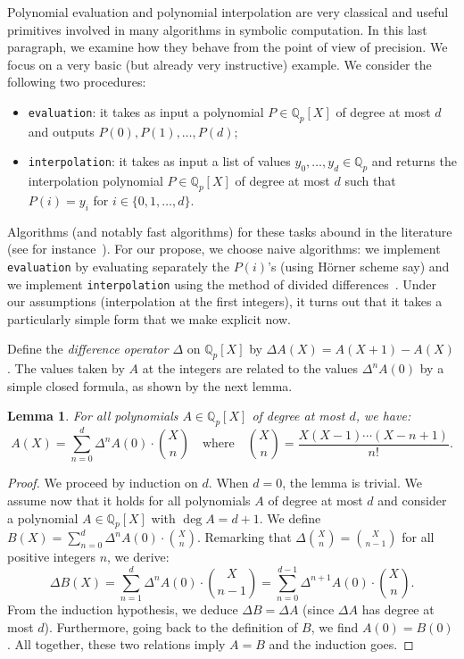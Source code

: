 \documentclass[11pt]{article}
\numberwithin{equation}{section}
\numberwithin{figure}{section}
\newtheorem{lem}[theo]{Lemma}
\theoremstyle{definition}
\newcommand{\Q}{\mathbb Q}
\newcommand{\Qp}{\Q_p}
\begin{document}
Polynomial evaluation and polynomial interpolation are very classical 
and useful primitives involved in many algorithms in symbolic 
computation. In this last paragraph, we examine how they behave from
the point of view of precision. We focus on a very basic (but already
very instructive) example.
We consider the following two procedures:
\begin{itemize}
\renewcommand{\itemsep}{0pt}
\item \texttt{evaluation}: it takes as input a polynomial $P \in \Qp[X]$ 
of degree at most $d$ and outputs $P(0), P(1), \ldots, P(d)$;
\item \texttt{interpolation}: it takes as input a list of values $y_0, 
\ldots, y_d \in \Qp$ and returns the interpolation polynomial $P \in 
\Qp[X]$ of degree at most $d$ such that $P(i) = y_i$ for $i \in \{0,1,\ldots, d\}$.
\end{itemize}
Algorithms (and notably fast algorithms) for these tasks abound in the
literature (see for instance~\cite[\S 10]{GaGe03}). For our propose, we choose naive algorithms: we implement
\texttt{evaluation} by evaluating separately the $P(i)$'s (using Hörner
scheme say) and we implement \texttt{interpolation} using the method
of divided differences~\cite[\S 2]{Hi56}. Under our assumptions 
(interpolation at the first integers), it turns out that it takes a 
particularly simple form that we make explicit now.

Define the \emph{difference operator} $\Delta$ on $\Qp[X]$ by $\Delta 
A(X) = A(X+1) - A(X)$. The values taken by $A$ at the integers are 
related to the values $\Delta^n A(0)$ by a simple closed formula, as
shown by the next lemma.

\begin{lem}
\label{lem:mahler}
For all polynomials $A \in \Qp[X]$ of degree at most $d$, we have:
$$A(X) = \sum_{n=0}^d \Delta^n A(0) \cdot \binom X n
\quad \text{where} \quad
\binom X n = \frac{X(X-1)\cdots (X-n+1)}{n!}.$$
\end{lem}

\begin{proof}
We proceed by induction on $d$. When $d = 0$, the lemma is trivial.
We assume now that it holds for all polynomials $A$ of degree at most
$d$ and consider a polynomial $A \in \Qp[X]$ with $\deg A = d{+}1$.
We define $B(X) = \sum_{n=0}^d \Delta^n A(0) \cdot \binom X n$. 
Remarking that $\Delta \binom X n = 
\binom X{n-1}$ for all positive integers $n$, we derive:
$$\Delta B (X) = \sum_{n=1}^d \Delta^n A(0) \cdot \binom X {n-1}
= \sum_{n=0}^{d-1} \Delta^{n+1} A(0) \cdot \binom X n.$$
From the induction hypothesis, we deduce $\Delta B = \Delta A$ (since 
$\Delta A$ has degree at most $d$). Furthermore, going back to the
definition of $B$, we find $A(0) = B(0)$. All together, these two
relations imply $A = B$ and the induction goes.
\end{proof}
\end{document}
